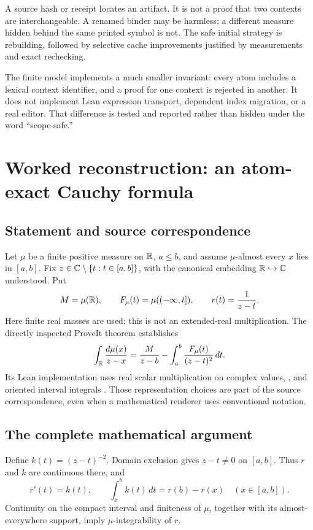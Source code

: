 \documentclass[11pt,a4paper]{article}
\newcommand{\code}[1]{\texttt{\detokenize{#1}}}
\numberwithin{equation}{section}
\theoremstyle{definition}\newtheorem{definition}[theorem]{Definition}
\theoremstyle{remark}\newtheorem{remark}[theorem]{Remark}
\begin{document}
A source hash or receipt locates an artifact. It is not a proof that two
contexts are interchangeable. A renamed binder may be harmless; a different
measure hidden behind the same printed symbol is not. The safe initial
strategy is rebuilding, followed by selective cache improvements justified
by measurements and exact rechecking.

The finite model implements a much smaller invariant: every atom includes a
lexical context identifier, and a proof for one context is rejected in another.
It does not implement Lean expression transport, dependent index migration,
or a real editor. That difference is tested and reported rather than hidden
under the word ``scope-safe.''

\section{Worked reconstruction: an atom-exact Cauchy formula}\label{sec:cauchy}

\subsection{Statement and source correspondence}
Let \(\mu\) be a finite positive measure on \(\mathbb R\), \(a\le b\), and assume
\(\mu\)-almost every \(x\) lies in \([a,b]\). Fix
\(z\in\mathbb C\setminus\{t:t\in[a,b]\}\), with the canonical embedding
\(\mathbb R\hookrightarrow\mathbb C\) understood. Put
\[
 M=\mu(\mathbb R),\qquad F_\mu(t)=\mu(( -\infty,t]),\qquad r(t)=\frac1{z-t}.
\]
Here finite real masses are used; this is not an extended-real multiplication.
The directly inspected ProveIt theorem establishes
\begin{equation}\label{eq:cauchy}
 \int_\mathbb R\frac{d\mu(x)}{z-x}
 =\frac{M}{z-b}
   -\int_a^b\frac{F_\mu(t)}{(z-t)^2}\,dt.
\end{equation}
Its Lean implementation uses real scalar multiplication on complex values,
\code{Measure.real}, and oriented interval integrals \cite{cauchy}.
Those representation choices are part of the source correspondence, even when
a mathematical renderer uses conventional notation.

\subsection{The complete mathematical argument}
Define \(k(t)=(z-t)^{-2}\). Domain exclusion gives \(z-t\ne0\) on \([a,b]\).
Thus \(r\) and \(k\) are continuous there, and
\begin{equation}\label{eq:primitive}
 r'(t)=k(t),\qquad
 \int_x^b k(t)\,dt=r(b)-r(x)\quad(x\in[a,b]).
\end{equation}
Continuity on the compact interval and finiteness of \(\mu\), together with
its almost-everywhere support, imply \(\mu\)-integrability of \(r\).
\end{document}
